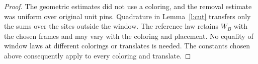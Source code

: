 \begin{proof}
The geometric estimates did not use a coloring, and the
removal estimate was uniform over original unit pins.
Quadrature in Lemma~\ref{l:cut} transfers only the sums over
the sites outside the window.  The reference law retains
\(W_B\) with the chosen frames and may vary with the coloring
and placement.  No equality of window laws at different
colorings or translates is needed.  The constants chosen
above consequently apply to every coloring and translate.
\end{proof}
